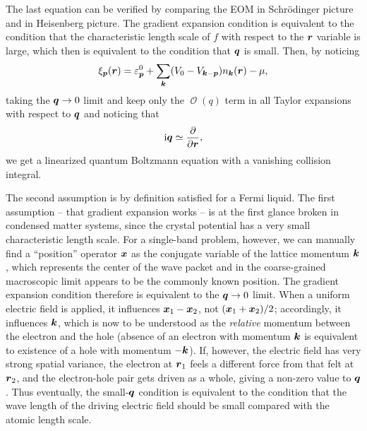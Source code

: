 \documentclass[hyperref, a4paper]{article}
\newcommand*{\ii}{\mathrm{i}}
\DeclareMathOperator{\bigO}{\mathcal{O}}
\begin{document}
The last equation can be verified by comparing 
the EOM in Schr\"{o}dinger picture \cite{egri1985excitons} and in Heisenberg picture.
The gradient expansion condition is equivalent to the condition that 
the characteristic length scale of $f$ with respect to the $\vb*{r}$ variable is large,
which then is equivalent to the condition that $\vb*{q}$ is small.
Then, by noticing 
\begin{equation}
    \xi_{\vb*{p}}(\vb*{r}) = \varepsilon^0_{\vb*{p}}
    + \sum_{\vb*{k}} (V_{0} - V_{\vb*{k} - \vb*{p}} ) n_{\vb*{k}}(\vb*{r}) - \mu,
    \label{eq:simple-fermi-liquid-xi}
\end{equation}
taking the $\vb*{q} \to 0$ limit and keep only the $\bigO(q)$ term in all Taylor expansions 
with respect to $\vb*{q}$
and noticing that 
\[
    \ii \vb*{q} \simeq \pdv{\vb*{r}},
\]
we get a linearized quantum Boltzmann equation with a vanishing collision integral.

The second assumption is by definition satisfied for a Fermi liquid.
The first assumption -- that gradient expansion works -- is at the first glance 
broken in condensed matter systems, 
since the crystal potential has a very small characteristic length scale.
For a single-band problem, however, 
we can manually find a ``position'' operator $\vb*{x}$ as the conjugate variable 
of the lattice momentum $\vb*{k}$,
which represents the center of the wave packet 
and in the coarse-grained macroscopic limit 
appears to be the commonly known position.
The gradient expansion condition therefore is equivalent to the $\vb*{q} \to 0$ limit.
When a uniform electric field is applied, 
it influences $\vb*{x}_1 - \vb*{x}_2$, not $(\vb*{x}_1 + \vb*{x}_2) / 2$;
accordingly, it influences $\vb*{k}$, 
which is now to be understood as the \emph{relative} momentum 
between the electron and the hole 
(absence of an electron with momentum $\vb*{k}$ 
is equivalent to existence of a hole with momentum $- \vb*{k}$).
If, however, the electric field has very strong spatial variance, 
the electron at $\vb*{r}_1$ feels a different force 
from that felt at $\vb*{r}_2$,
and the electron-hole pair gets driven as a whole,
giving a non-zero value to $\vb*{q}$.
Thus eventually, 
the small-$\vb*{q}$ condition is equivalent to 
the condition that the wave length of the driving electric field 
should be small compared with the atomic length scale.
\end{document}
